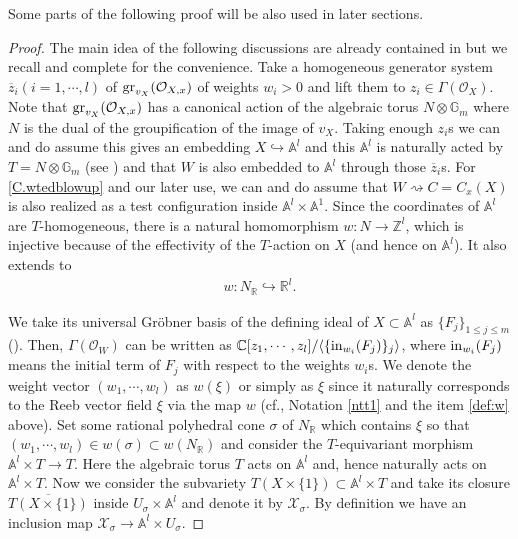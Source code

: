 \documentclass[12pt,a4paper]{amsart}
\theoremstyle{remark}
\theoremstyle{definition}
\def\R{\mathbb{R}}
\def\C{\mathbb{C}}
\def\G{\mathbb{G}}
\def\Z{\mathbb{Z}}
\def\O{\mathcal{O}}
\def\A{\mathbb{A}}
\def\X{\mathcal{X}}
\begin{document}
Some parts of the following proof will be also used in later sections. 
\begin{proof}
The main idea of the following discussions are already contained in 
\cite{LX, Od24a, Od24c} but we recall and complete for the convenience. 
Take a homogeneous generator system $\overline{z}_i (i=1,\cdots,l)$ 
of 
${\rm gr}_{v_X}(\mathcal{O}_{X,x})$ of weights $w_i>0$ and 
lift them to $z_i\in \Gamma(\mathcal{O}_X)$. 
Note that ${\rm gr}_{v_X}(\mathcal{O}_{X,x})$ has a canonical 
action of the algebraic torus $N\otimes \G_m$ where 
$N$ is the dual of the groupification of the image of $v_X$. 
Taking enough 
$z_i$s we can and do assume this gives an embedding 
$X\hookrightarrow \A^l$ and this $\A^l$ 
is naturally acted by $T=N\otimes \G_m$ (see \cite[\S 2.3]{DSII}) 
and that $W$ is also embedded to $\A^l$ through those $\overline{z}_i$s. 
For \eqref{C.wtedblowup} and our later use, 
we can and do assume that $W\rightsquigarrow C=C_x(X)$ is also realized 
as a test configuration inside $\A^l\times \A^1$. 
Since the coordinates of $\A^l$ are $T$-homogeneous, 
there is a natural homomorphism $w\colon N\to \Z^l$, 
which is injective because of the effectivity of the $T$-action 
on $X$ (and hence on $\A^l$). It also 
extends to 
\begin{align}\label{def:w}
w\colon N_{\R}\hookrightarrow \R^l.
\end{align}

We take its 
universal Gr\"obner basis of the defining ideal of 
$X\subset \A^l$ 
as $\{F_j\}_{1\le j\le m}$ (\cite[\S 5.1]{BCRV}). 
Then, $\Gamma(\O_W)$ can be written as 
$\C[z_1,\cdots,z_l]/\langle \{{\rm in}_{w_i}(F_j) \}_j \rangle$, 
where ${\rm in}_{w_i}(F_j)$ means the 
initial term of $F_j$ with respect to the weights $w_i$s. 
We denote the weight vector $(w_1,\cdots,w_l)$ as $w(\xi)$ or 
simply as $\xi$ since it naturally corresponds to the 
Reeb vector field $\xi$ via the map $w$ (cf., Notation \ref{ntt1} and the item 
\eqref{def:w} above). 
Set some rational polyhedral cone $\sigma$ of $N_{\R}$ 
which contains $\xi$ so that 
$(w_1,\cdots,w_l)\in w(\sigma)\subset w(N_{\R})$ 
and consider the $T$-equivariant 
morphism $\A^l \times T 
 \to T$. Here the algebraic torus 
 $T$ acts on $\A^l$ and, hence naturally acts on $\A^l \times T$. Now we consider the subvariety $T(X \times \{1\}) \subset \A^l \times T$ and take its closure 
 $\overline{T(X \times \{1\})}$ 
 inside $U_\sigma\times \A^l$ and denote it by 
 $\X_{\sigma}$. By definition we have an inclusion map $\X_{\sigma} \to \A^l \times U_\sigma$. 


\end{proof}
\end{document}
